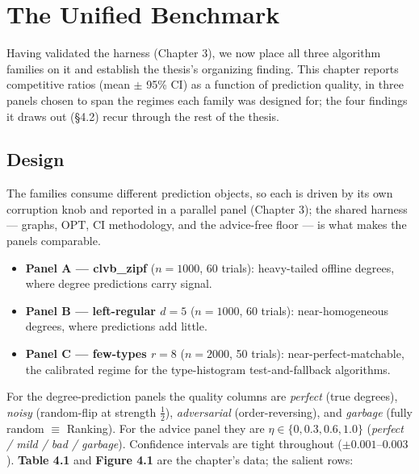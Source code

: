 \chapter{The Unified Benchmark}\label{the-unified-benchmark}

Having validated the harness (Chapter 3), we now place all three algorithm families on it
and establish the thesis's organizing finding. This chapter reports competitive ratios
(mean \(\pm\) 95\% CI) as a function of prediction quality, in three panels chosen to span the
regimes each family was designed for; the four findings it draws out (§4.2) recur through
the rest of the thesis.

\section{Design}\label{design}

The families consume different prediction objects, so each is driven by its own corruption
knob and reported in a parallel panel (Chapter 3); the shared harness --- graphs,
\(\mathrm{OPT}\), CI methodology, and the advice-free floor --- is what makes the panels
comparable.

\begin{itemize}
\tightlist
\item
  \textbf{Panel A --- clvb\_zipf} (\(n=1000\), 60 trials): heavy-tailed offline degrees, where degree
  predictions carry signal.
\item
  \textbf{Panel B --- left-regular \(d{=}5\)} (\(n=1000\), 60 trials): near-homogeneous degrees, where
  predictions add little.
\item
  \textbf{Panel C --- few-types \(r{=}8\)} (\(n=2000\), 50 trials): near-perfect-matchable, the
  calibrated regime for the type-histogram test-and-fallback algorithms.
\end{itemize}

For the degree-prediction panels the quality columns are \emph{perfect} (true degrees), \emph{noisy}
(random-flip at strength \(\tfrac12\)), \emph{adversarial} (order-reversing), and \emph{garbage}
(fully random \(\equiv\) Ranking). For the advice panel they are \(\eta\in\{0,0.3,0.6,1.0\}\)
(\emph{perfect / mild / bad / garbage}). Confidence intervals are tight throughout
(\(\pm0.001\)--\(0.003\)). \textbf{Table 4.1} and \textbf{Figure 4.1} are the chapter's data; the salient
rows:

